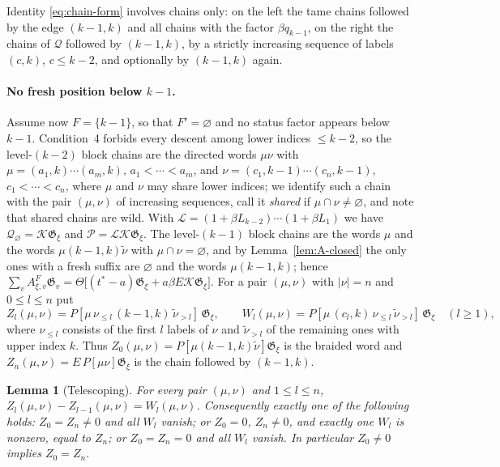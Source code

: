 \documentclass[11pt]{article}
\newtheorem{lemma}[proposition]{Lemma}
\newcommand{\G}{\mathfrak{G}}
\begin{document}
Identity \eqref{eq:chain-form} involves chains only: on the left the
tame chains followed by the edge $(k-1,k)$ and all chains with the
factor $\beta q_{k-1}$, on the right the chains of $\mathcal Q$
followed by $(k-1,k)$, by a strictly increasing sequence of labels
$(c,k)$, $c\leq k-2$, and optionally by $(k-1,k)$ again.

\paragraph{No fresh position below $k-1$.}
Assume now $F=\{k-1\}$, so that $F'=\varnothing$ and no status factor
appears below $k-1$. Condition~4 forbids every descent among lower
indices $\leq k-2$, so the level-$(k-2)$ block chains are the directed
words $\mu\nu$ with $\mu=(a_1,k)\cdots(a_m,k)$, $a_1<\cdots<a_m$, and
$\nu=(c_1,k-1)\cdots(c_n,k-1)$, $c_1<\cdots<c_n$, where $\mu$ and $\nu$
may share lower indices; we identify such a chain with the pair
$(\mu,\nu)$ of increasing sequences, call it \emph{shared} if
$\mu\cap\nu\neq\varnothing$, and note that shared chains are wild.
With $\mathcal L=(1+\beta L_{k-2})\cdots(1+\beta L_1)$ we have
$\mathcal Q_\varnothing=\mathcal K\G_\xi$ and
$\mathcal P=\mathcal L\mathcal K\G_\xi$. The level-$(k-1)$ block
chains are the words $\mu$ and the words $\mu(k-1,k)\tilde\nu$ with
$\mu\cap\nu=\varnothing$, and by Lemma~\ref{lem:A-closed} the only
ones with a fresh suffix are $\varnothing$ and the words
$\mu(k-1,k)$; hence
$\sum_vA^F_{\xi,v}\G_v=\Theta\bigl[(t^\ast-a)\G_\xi+a\beta E\mathcal K\G_\xi\bigr]$.
For a pair $(\mu,\nu)$ with $|\nu|=n$ and $0\leq l\leq n$ put
\[
 Z_l(\mu,\nu)=P[\mu\,\nu_{\leq l}\,(k-1,k)\,\tilde\nu_{>l}]\,\G_\xi,
 \qquad
 W_l(\mu,\nu)=P[\mu\,(c_l,k)\,\nu_{\leq l}\,\tilde\nu_{>l}]\,\G_\xi\quad(l\geq1),
\]
where $\nu_{\leq l}$ consists of the first $l$ labels of $\nu$ and
$\tilde\nu_{>l}$ of the remaining ones with upper index $k$. Thus
$Z_0(\mu,\nu)=P[\mu(k-1,k)\tilde\nu]\G_\xi$ is the braided word and
$Z_n(\mu,\nu)=E\,P[\mu\nu]\G_\xi$ is the chain followed by $(k-1,k)$.

\begin{lemma}[Telescoping]\label{lem:telescoping}
For every pair $(\mu,\nu)$ and $1\leq l\leq n$,
$Z_l(\mu,\nu)-Z_{l-1}(\mu,\nu)=W_l(\mu,\nu)$. Consequently exactly one
of the following holds: $Z_0=Z_n\neq0$ and all $W_l$ vanish; or
$Z_0=0$, $Z_n\neq0$, and exactly one $W_l$ is nonzero, equal to
$Z_n$; or $Z_0=Z_n=0$ and all $W_l$ vanish. In particular $Z_0\neq0$
implies $Z_0=Z_n$.
\end{lemma}
\end{document}
